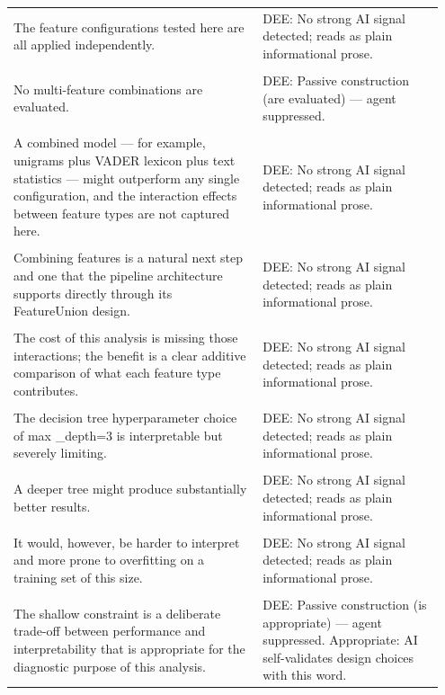 \documentclass[11pt]{article}
\begin{document}
\begin{longtable}{|p{0.55\linewidth}|p{0.40\linewidth}|}
\hline
\rule{0pt}{3.5cm} & \\
\hline
The feature configurations tested here are all applied independently. & DEE: No strong AI signal detected; reads as plain informational prose. \\[2pt]
\hline
\rule{0pt}{3.5cm} & \\
\hline
No multi-feature combinations are evaluated. & DEE: Passive construction (are evaluated) --- agent suppressed. \\[2pt]
\hline
\rule{0pt}{3.5cm} & \\
\hline
A combined model --- for example, unigrams plus VADER lexicon plus text statistics --- might outperform any single configuration, and the interaction effects between feature types are not captured here. & DEE: No strong AI signal detected; reads as plain informational prose. \\[2pt]
\hline
\rule{0pt}{3.5cm} & \\
\hline
Combining features is a natural next step and one that the pipeline architecture supports directly through its FeatureUnion design. & DEE: No strong AI signal detected; reads as plain informational prose. \\[2pt]
\hline
\rule{0pt}{3.5cm} & \\
\hline
The cost of this analysis is missing those interactions; the benefit is a clear additive comparison of what each feature type contributes. & DEE: No strong AI signal detected; reads as plain informational prose. \\[2pt]
\hline
\rule{0pt}{3.5cm} & \\
\hline
The decision tree hyperparameter choice of max \_depth=3 is interpretable but severely limiting. & DEE: No strong AI signal detected; reads as plain informational prose. \\[2pt]
\hline
\rule{0pt}{3.5cm} & \\
\hline
A deeper tree might produce substantially better results. & DEE: No strong AI signal detected; reads as plain informational prose. \\[2pt]
\hline
\rule{0pt}{3.5cm} & \\
\hline
It would, however, be harder to interpret and more prone to overfitting on a training set of this size. & DEE: No strong AI signal detected; reads as plain informational prose. \\[2pt]
\hline
\rule{0pt}{3.5cm} & \\
\hline
The shallow constraint is a deliberate trade-off between performance and interpretability that is appropriate for the diagnostic purpose of this analysis. & DEE: Passive construction (is appropriate) --- agent suppressed. Appropriate: AI self-validates design choices with this word. \\[2pt]

\end{longtable}
\end{document}
